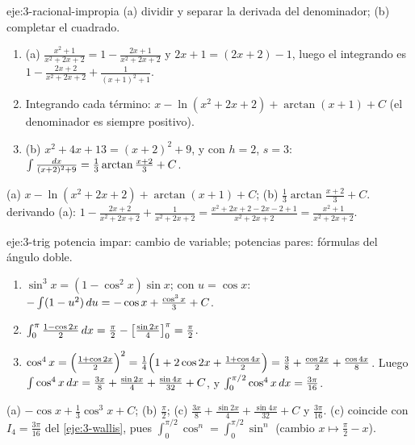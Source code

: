 \begin{solucion}{eje:3-racional-impropia}
\planteamiento (a) dividir y separar la derivada del denominador; (b) completar el cuadrado.
\pasos
\begin{enumerate}[label=\arabic*.]
  \item (a) $\frac{x^{2}+1}{x^{2}+2x+2}=1-\frac{2x+1}{x^{2}+2x+2}$ y $2x+1=(2x+2)-1$, luego el integrando es $1-\frac{2x+2}{x^{2}+2x+2}+\frac{1}{(x+1)^{2}+1}$.
  \item Integrando cada término: $x-\ln(x^{2}+2x+2)+\arctan(x+1)+C$ (el denominador es siempre positivo).
  \item (b) $x^{2}+4x+13=(x+2)^{2}+9$, y con $h=2$, $s=3$: $\int\frac{\mathop{}\!d x}{(x+2)^{2}+9}=\frac13\arctan\frac{x+2}{3}+C$.
\end{enumerate}
\resultado (a) $x-\ln(x^{2}+2x+2)+\arctan(x+1)+C$; (b) $\frac13\arctan\frac{x+2}{3}+C$.
\comprobacion derivando (a): $1-\frac{2x+2}{x^{2}+2x+2}+\frac{1}{x^{2}+2x+2}=\frac{x^{2}+2x+2-2x-2+1}{x^{2}+2x+2}=\frac{x^{2}+1}{x^{2}+2x+2}$.
\end{solucion}

\begin{solucion}{eje:3-trig}
\planteamiento potencia impar: cambio de variable; potencias pares: fórmulas del ángulo doble.
\pasos
\begin{enumerate}[label=(\alph*)]
  \item $\sin^{3}x=(1-\cos^{2}x)\sin x$; con $u=\cos x$: $-\int(1-u^{2})\mathop{}\!d u=-\cos x+\frac{\cos^{3}x}{3}+C$.
  \item $\int_0^{\pi}\frac{1-\cos2x}{2}\mathop{}\!d x=\frac\pi2-\bigl[\frac{\sin2x}{4}\bigr]_{0}^{\pi}=\frac\pi2$.
  \item $\cos^{4}x=\Bigl(\frac{1+\cos2x}{2}\Bigr)^{2}=\frac14\Bigl(1+2\cos2x+\frac{1+\cos4x}{2}\Bigr)=\frac38+\frac{\cos2x}{2}+\frac{\cos4x}{8}$. Luego $\int\cos^{4}x\mathop{}\!d x=\frac{3x}{8}+\frac{\sin2x}{4}+\frac{\sin4x}{32}+C$, y $\int_0^{\pi/2}\cos^{4}x\mathop{}\!d x=\frac{3\pi}{16}$.
\end{enumerate}
\resultado (a) $-\cos x+\frac13\cos^{3}x+C$; (b) $\frac\pi2$; (c) $\frac{3x}{8}+\frac{\sin2x}{4}+\frac{\sin4x}{32}+C$ y $\frac{3\pi}{16}$.
\comprobacion (c) coincide con $I_4=\frac{3\pi}{16}$ del \cref{eje:3-wallis}, pues $\int_0^{\pi/2}\cos^{n}=\int_0^{\pi/2}\sin^{n}$ (cambio $x\mapsto\frac\pi2-x$).
\end{solucion}

